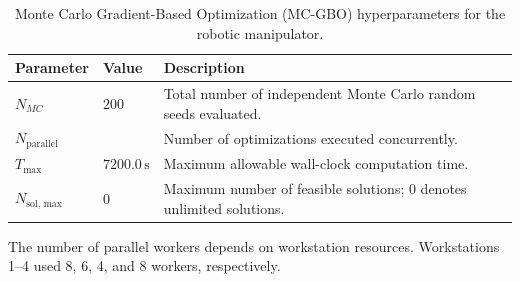 \begin{table}[htbp]
    \centering
    \begin{threeparttable}
        \caption{Monte Carlo Gradient-Based Optimization (MC-GBO) hyperparameters for the robotic manipulator.}
        \label{tab:params_mc_gbo_robot}
        \begin{tabularx}{\textwidth}{l l X}
            \toprule
            \textbf{Parameter} & \textbf{Value} & \textbf{Description} \\
            \midrule
            $N_{MC}$ & $200$ & Total number of independent Monte Carlo random seeds evaluated. \\
            $N_{\text{parallel}}$ & \tnote{$\dagger$} & Number of optimizations executed concurrently. \\
            $T_{\max}$ & $7200.0\,\mathrm{s}$ & Maximum allowable wall-clock computation time. \\
            $N_{\text{sol, max}}$ & $0$ & Maximum number of feasible solutions; $0$ denotes unlimited solutions. \\
            \bottomrule
        \end{tabularx}
        \begin{tablenotes}[flushleft]
            \footnotesize
            \item[$\dagger$] The number of parallel workers depends on workstation resources. Workstations 1--4 used 8, 6, 4, and 8 workers, respectively.
        \end{tablenotes}
    \end{threeparttable}
\end{table}


